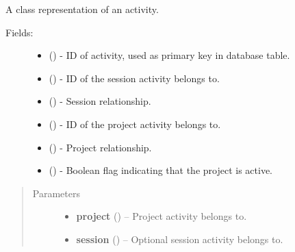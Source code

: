 \documentclass[letterpaper,10pt,english]{sphinxmanual}
\begin{document}
\begin{fulllineitems}
\label{api:models.Activity}
A class representation of an activity.
\begin{description}
\item[{Fields:}] \leavevmode\begin{itemize}
\item {} 
 () - ID of activity, used as primary key in database table.

\item {} 
 () - ID of the session activity belongs to.

\item {} 
 () - Session relationship.

\item {} 
 () - ID of the project activity belongs to.

\item {} 
 () - Project relationship.

\item {} 
 () - Boolean flag indicating that the project is active.

\end{itemize}

\end{description}
\begin{quote}\begin{description}
\item[{Parameters}] \leavevmode\begin{itemize}
\item {} 
\textbf{project} ({\hyperref[api:models.Project]{}}) -- Project activity belongs to.

\item {} 
\textbf{session} ({\hyperref[api:models.Session]{}}) -- Optional session activity belongs to.

\end{itemize}

\end{description}\end{quote}

\end{fulllineitems}
\end{document}
